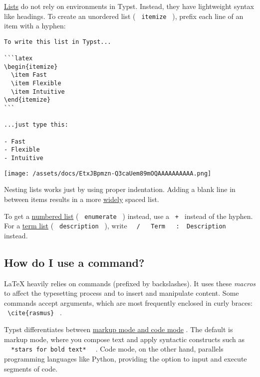 \href{/docs/reference/model/list/}{Lists} do not rely on environments in
Typst. Instead, they have lightweight syntax like headings. To create an
unordered list ( \texttt{\ itemize\ } ), prefix each line of an item
with a hyphen:

\begin{verbatim}
To write this list in Typst...

```latex
\begin{itemize}
  \item Fast
  \item Flexible
  \item Intuitive
\end{itemize}
```

...just type this:

- Fast
- Flexible
- Intuitive
\end{verbatim}

\texttt{[image: /assets/docs/EtxJBpmzn-Q3caUem89mOQAAAAAAAAAA.png]}

Nesting lists works just by using proper indentation. Adding a blank
line in between items results in a more
\href{/docs/reference/model/list/\#parameters-tight}{widely} spaced
list.

To get a \href{/docs/reference/model/enum/}{numbered list} (
\texttt{\ enumerate\ } ) instead, use a \texttt{\ +\ } instead of the
hyphen. For a \href{/docs/reference/model/terms/}{term list} (
\texttt{\ description\ } ), write
\texttt{\ }{\texttt{\ /\ }}\texttt{\ }{\texttt{\ Term\ }}\texttt{\ }{\texttt{\ :\ }}\texttt{\ Description\ }
instead.

\subsection{How do I use a command?}\label{commands}

LaTeX heavily relies on commands (prefixed by backslashes). It uses
these \emph{macros} to affect the typesetting process and to insert and
manipulate content. Some commands accept arguments, which are most
frequently enclosed in curly braces:
\texttt{\ \textbackslash{}cite\{rasmus\}\ } .

Typst differentiates between
\href{/docs/reference/scripting/\#blocks}{markup mode and code mode} .
The default is markup mode, where you compose text and apply syntactic
constructs such as
\texttt{\ }{\texttt{\ *stars\ for\ bold\ text*\ }}\texttt{\ } . Code
mode, on the other hand, parallels programming languages like Python,
providing the option to input and execute segments of code.

